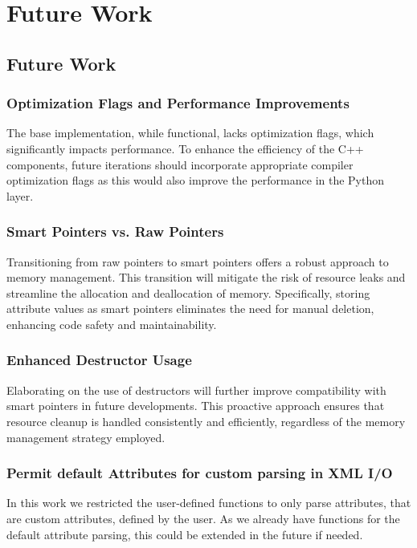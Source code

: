 \chapter{Future Work}\label{chapter:fw_conc} 

\section{Future Work}

\subsection{Optimization Flags and Performance Improvements}

The base implementation, while functional, lacks optimization flags, which significantly impacts performance. To enhance the efficiency of the C++ components, future iterations should incorporate appropriate compiler optimization flags as this would also improve the performance in the Python layer.

\subsection{Smart Pointers vs. Raw Pointers}

Transitioning from raw pointers to smart pointers offers a robust approach to memory management. This transition will mitigate the risk of resource leaks and streamline the allocation and deallocation of memory. Specifically, storing attribute values as smart pointers eliminates the need for manual deletion, enhancing code safety and maintainability.

\subsection{Enhanced Destructor Usage}

Elaborating on the use of destructors will further improve compatibility with smart pointers in future developments. This proactive approach ensures that resource cleanup is handled consistently and efficiently, regardless of the memory management strategy employed.

\subsection{Permit default Attributes for custom parsing in XML I/O}

In this work we restricted the user-defined functions to only parse attributes, that are custom attributes, defined by the user. As we already have functions for the default attribute parsing, this could be extended in the future if needed.

